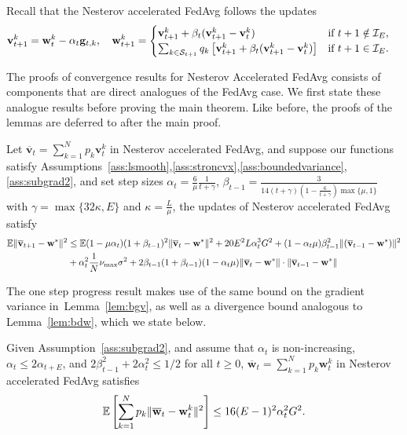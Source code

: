 Recall that the Nesterov accelerated FedAvg follows the updates 
\begin{align*}
\mathbf{v}_{t+1}^{k} & =\mathbf{w}_{t}^{k}-\alpha_{t}\mathbf{g}_{t,k}, \hspace{1em}
\mathbf{w}_{t+1}^{k} =\begin{cases}
\mathbf{v}_{t+1}^{k}+\beta_{t}(\mathbf{v}_{t+1}^{k}-\mathbf{v}_{t}^{k}) & \text{if }t+1\notin\mathcal{I}_{E},\\
\sum_{k \in {\mathcal{S}}_{t+1}}q_k\left[\mathbf{v}_{t+1}^{k}+\beta_{t}(\mathbf{v}_{t+1}^{k}-\mathbf{v}_{t}^{k})\right] & \text{if }t+1\in\mathcal{I}_{E}.
\end{cases}
\end{align*}

The proofs of convergence results for Nesterov Accelerated FedAvg consists of components that are direct analogues of the FedAvg case. We first state these analogue results before proving the main theorem. Like before, the proofs of the lemmas are deferred to after the main proof. 

\begin{lemma} Let $\overline{\mathbf{v}}_{t}=\sum_{k=1}^{N}p_{k}\mathbf{v}_{t}^{k}$ in Nesterov accelerated FedAvg,
and suppose our functions satisfy Assumptions~\ref{ass:lsmooth},\ref{ass:stroncvx},\ref{ass:boundedvariance},\ref{ass:subgrad2}, and set step sizes $\alpha_{t}=\frac{6}{\mu}\frac{1}{t+\gamma}$,  $\beta_{t-1}=\frac{3}{14(t+\gamma)(1-\frac{6}{t+\gamma})\max\{\mu,1\}}$
	with $\gamma=\max\{32\kappa,E\}$ and $\kappa=\frac{L}{\mu}$, the updates of Nesterov accelerated FedAvg satisfy
\begin{align*}
\mathbb{E}\|{\overline{\mathbf{v}}}_{t+1}-{\mathbf{w}}^{\ast}\|^{2} & \leq\mathbb{E}(1-\mu\alpha_{t})(1+\beta_{t-1})^{2}\|{\overline{\mathbf{v}}}_{t}-{\mathbf{w}}^{\ast}\|^{2}+20E^{2}L\alpha_{t}^{3}G^{2}+(1-\alpha_{t}\mu)\beta_{t-1}^{2}\|({\overline{\mathbf{v}}}_{t-1}-{\mathbf{w}}^{\ast})\|^{2}\\
& +\alpha_{t}^{2}\frac{1}{N}\nu_{\max}\sigma^{2}+2\beta_{t-1}(1+\beta_{t-1})(1-\alpha_{t}\mu)\|{\overline{\mathbf{v}}}_{t}-{\mathbf{w}}^{\ast}\|\cdot\|{\overline{\mathbf{v}}}_{t-1}-{\mathbf{w}}^{\ast}\|
\end{align*}
\label{lem:nest-scvxoner}
\end{lemma}

The one step progress result makes use of the same bound on the gradient variance in~Lemma~\ref{lem:bgv}, as well as a divergence bound analogous to Lemma~\ref{lem:bdw}, which we state below.
\begin{lemma}
Given Assumption~\ref{ass:subgrad2}, and assume that $\alpha_t$ is non-increasing, $\alpha_t \leq 2\alpha_{t+E}$, and $2\beta_{t-1}^{2}+2\alpha_{t}^{2}\leq1/2$ for all $t\geq 0$, $\overline{\mathbf{w}}_{t}=\sum_{k=1}^{N}p_{k}\mathbf{w}_{t}^{k}$ in Nesterov accelerated FedAvg satisfies
	\begin{align*}
	\mathbb{E}\left[\sum_{k=1}^{N}p_{k}\|{\overline{\mathbf{w}}}_{t}-{\mathbf{w}}_{t}^{k}\|^{2} \right]\leq16(E-1)^{2}\alpha_{t}^{2}G^{2}.
	\end{align*}
\label{lem:nest-bdw}
\end{lemma}

